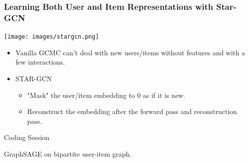 \documentclass[11pt]{beamer}
\begin{document}
	\begin{frame}
		\frametitle{Learning Both User and Item Representations with Star-GCN}
		\begin{center}
			\centering
			\texttt{[image: images/stargcn.png]}
		\end{center}
		\begin{itemize}
			\item Vanilla GCMC can't deal with new users/items without features and with a few interactions.
			\item STAR-GCN
			\begin{itemize}
				\item "Mask" the user/item embedding to 0 as if it is new.
				\item Reconstruct the embedding after the forward pass and reconstruction pass.
			\end{itemize}
		\end{itemize}
	\end{frame}

	\begin{frame}
		\begin{center}
			\centering
			\Huge Coding Session
			
			\Large GraphSAGE on bipartite user-item graph.
		\end{center}
	\end{frame}
\end{document}
